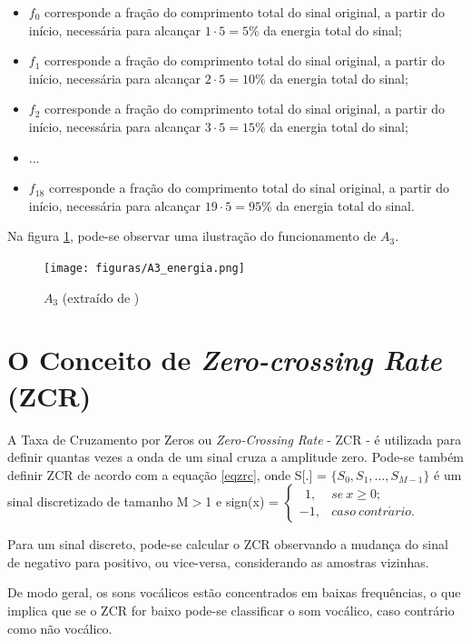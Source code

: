\documentclass[a4paper,12pt,twoside,openright]{report}
\begin{document}
\begin{itemize}
\item{}$f_0$ corresponde a fra\c{c}\~{a}o do comprimento total do sinal original, a partir do in\'{i}cio, necess\'{a}ria para alcan\c{c}ar $1 \cdot 5 = 5\%$ da energia total do sinal; 
\item{}$f_1$ corresponde a fra\c{c}\~{a}o do comprimento total do sinal original, a partir do in\'{i}cio, necess\'{a}ria para alcan\c{c}ar $2 \cdot 5 = 10\%$ da energia total do sinal; 
\item{}$f_2$ corresponde a fra\c{c}\~{a}o do comprimento total do sinal original, a partir do in\'{i}cio, necess\'{a}ria para alcan\c{c}ar $3 \cdot 5 = 15\%$ da energia total do sinal; 
\item{}...
\item{}$f_{18}$ corresponde a fra\c{c}\~{a}o do comprimento total do sinal original, a partir do in\'{i}cio, necess\'{a}ria para alcan\c{c}ar $19 \cdot 5 = 95\%$ da energia total do sinal. 
\end{itemize}

\par Na figura \ref{figura:A3}, pode-se observar uma ilustra{\c c}\~{a}o do funcionamento de $A_3$.

\begin{figure}[H]
	\centering
	\texttt{[image: figuras/A3\_energia.png]}
	\caption{$A_3$ (extra\'{i}do de \cite{tut_energia})}
	\label{figura:A3}
\end{figure}

\section{O Conceito de \textit{Zero-crossing Rate} (ZCR)}

\par A Taxa de Cruzamento por Zeros ou \textit{Zero-Crossing Rate} - ZCR - \'{e} utilizada para definir quantas vezes a onda de um sinal cruza a amplitude zero. Pode-se tamb\'{e}m definir ZCR de acordo com a equa{\c c}\~{a}o \ref{eqzrc}, onde S[.] = $\{S_0, S_1, ..., S_{M-1}\}$ \'{e} um sinal discretizado de tamanho M$>$1 e sign(x) =
$
\begin{cases}
	\ \ 1, & se \ x \geqslant 0; \\
	-1, & caso \ contr\acute{a}rio.
\end{cases}
$

\par Para um sinal discreto, pode-se calcular o ZCR observando a mudan{\c c}a do sinal de negativo para positivo, ou vice-versa, considerando as amostras vizinhas.
\par De modo geral, os sons voc\'{a}licos est\~{a}o concentrados em baixas frequ\^{e}ncias, o que implica que se o ZCR for baixo pode-se classificar o som voc\'{a}lico, caso contr\'{a}rio como n\~{a}o voc\'{a}lico.
\end{document}
